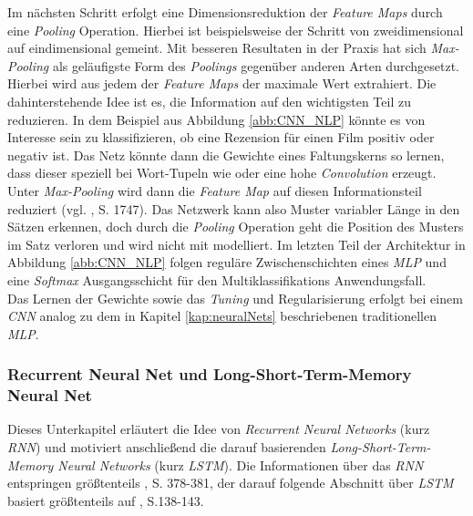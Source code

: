 \documentclass[a4paper,11pt]{article}
\begin{document}
Im nächsten Schritt erfolgt eine Dimensionsreduktion der \textit{Feature Maps} durch eine \textit{Pooling} Operation. Hierbei ist beispielsweise der Schritt von zweidimensional auf eindimensional gemeint. Mit besseren Resultaten in der Praxis hat sich \textit{Max-Pooling} als geläufigste Form des \textit{Poolings} gegenüber anderen Arten durchgesetzt. Hierbei wird aus jedem der \textit{Feature Maps} der maximale Wert extrahiert. Die dahinterstehende Idee ist es, die Information auf den wichtigsten Teil zu reduzieren. In dem Beispiel aus Abbildung \ref{abb:CNN_NLP} könnte es von Interesse sein zu klassifizieren, ob eine Rezension für einen Film positiv oder negativ ist. Das Netz könnte dann die Gewichte eines Faltungskerns so lernen, dass dieser speziell bei Wort-Tupeln wie  oder  eine hohe \textit{Convolution} erzeugt. Unter \textit{Max-Pooling} wird dann die \textit{Feature Map} auf diesen Informationsteil reduziert (vgl. \cite{cnnSentence}, S. 1747). Das Netzwerk kann also Muster variabler Länge in den Sätzen erkennen, doch durch die \textit{Pooling} Operation geht die Position des Musters im Satz verloren und wird nicht mit modelliert.
Im letzten Teil der Architektur in Abbildung \ref{abb:CNN_NLP} folgen reguläre Zwischenschichten eines \textit{MLP} und eine \textit{Softmax} Ausgangsschicht für den Multiklassifikations Anwendungsfall.\\
Das Lernen der Gewichte sowie das \textit{Tuning} und Regularisierung erfolgt bei einem \textit{CNN} analog zu dem in Kapitel \ref{kap:neuralNets} beschriebenen traditionellen \textit{MLP}.

\subsubsection{Recurrent Neural Net und Long-Short-Term-Memory Neural Net} \label{kap:LSTM}

Dieses Unterkapitel erläutert die Idee von \textit{Recurrent Neural Networks} (kurz \textit{RNN}) und motiviert anschließend die darauf basierenden \textit{Long-Short-Term-Memory Neural Networks} (kurz \textit{LSTM}). Die Informationen über das \textit{RNN} entspringen größtenteils \cite{deepL}, S. 378-381, der darauf folgende Abschnitt über \textit{LSTM} basiert größtenteils auf \cite{deepNLP}, S.138-143.\\
\end{document}
